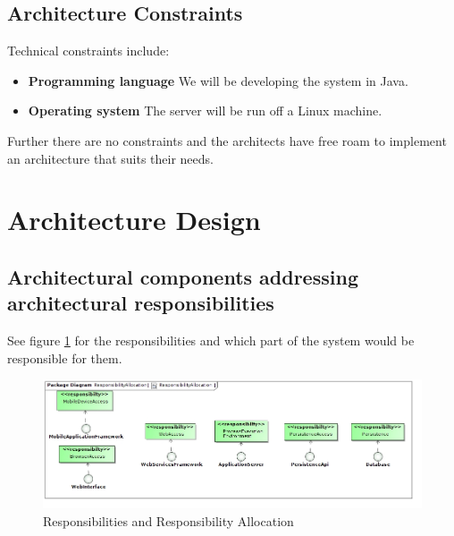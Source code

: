 \documentclass[hidelinks,english]{article}
\begin{document}
		\subsection{Architecture Constraints}
			Technical constraints include:
			\begin{itemize}
				\item \textbf{Programming language} We will be developing the system in Java.
				\item \textbf{Operating system} The server will be run off a Linux machine. 
			\end{itemize}
			Further there are no constraints and the architects have free roam to implement an architecture that suits their needs.
			
	\section{Architecture Design}
		\subsection{Architectural components addressing architectural responsibilities}
			See figure \ref{ResponsibilityAllocation} for the responsibilities and which part of the system would be responsible for them.
			\begin{figure}[!h]
				\includegraphics[width=\linewidth]{ResponsibilityAllocation.jpg}
				\caption{Responsibilities and Responsibility Allocation}
				\label{ResponsibilityAllocation}
			\end{figure}
		
\end{document}
